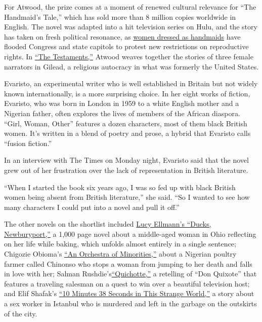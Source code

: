 For Atwood, the prize comes at a moment of renewed cultural relevance
for ``The Handmaid's Tale,'' which has sold more than 8 million copies
worldwide in English. The novel was adapted into a hit television series
on Hulu, and the story has taken on fresh political resonance, as
\href{https://www.nytimes.com/video/us/100000005479098/handmaids-protest-nationwide.html?module=inline}{women
dressed as handmaids} have flooded Congress and state capitols to
protest new restrictions on reproductive rights. In
\href{https://www.nytimes.com/2019/09/03/books/review/testaments-margaret-atwood-handmaids-tale.html?module=inline}{``The
Testaments,''} Atwood weaves together the stories of three female
narrators in Gilead, a religious autocracy in what was formerly the
United States.

Evaristo, an experimental writer who is well established in Britain but
not widely known internationally, is a more surprising choice. In her
eight works of fiction, Evaristo, who was born in London in 1959 to a
white English mother and a Nigerian father, often explores the lives of
members of the African diaspora. ``Girl, Woman, Other'' features a dozen
characters, most of them black British women. It's written in a blend of
poetry and prose, a hybrid that Evaristo calls ``fusion fiction.''

In an interview with The Times on Monday night, Evaristo said that the
novel grew out of her frustration over the lack of representation in
British literature.

``When I started the book six years ago, I was so fed up with black
British women being absent from British literature,'' she said. ``So I
wanted to see how many characters I could put into a novel and pull it
off.''

The other novels on the shortlist included
\href{https://www.nytimes.com/2019/09/03/books/review-ducks-newburyport-lucy-ellmann.html}{Lucy
Ellmann's ``Ducks, Newburyport,''} a 1,000 page novel about a
middle-aged woman in Ohio reflecting on her life while baking, which
unfolds almost entirely in a single sentence; Chigozie Obioma's
\href{https://www.nytimes.com/2019/01/21/books/review/chigozie-obioma-orchestra-minorities.html?module=inline}{``An
Orchestra of Minorities,''} about a Nigerian poultry farmer called
Chinonso who stops a woman from jumping to her death and falls in love
with her; Salman
Rushdie's\href{https://www.nytimes.com/2019/09/03/books/review/quichotte-salman-rushdie.html}{``Quichotte,''}
a retelling of ``Don Quixote'' that features a traveling salesman on a
quest to win over a beautiful television host; and Elif Shafak's
\href{https://www.theguardian.com/books/2019/jun/16/10-minutes-38-seconds-in-this-strange-world-by-elif-shafak-book-review}{``10
Minutes 38 Seconds in This Strange World,''} a story about a sex worker
in Istanbul who is murdered and left in the garbage on the outskirts of
the city.


